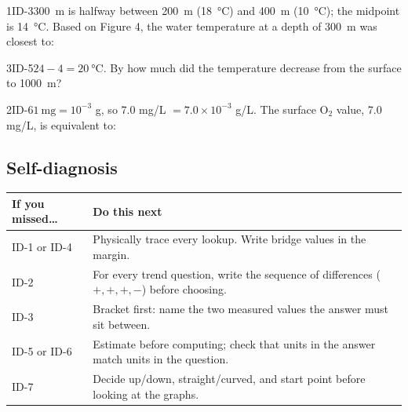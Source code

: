 \documentclass[11pt]{article}
\begin{document}
\begin{q}{1}{ID-3}{\SI{300}{\metre} is halfway between \SI{200}{\metre} (\SI{18}{\celsius}) and \SI{400}{\metre} (\SI{10}{\celsius}); the midpoint is \SI{14}{\celsius}.}
Based on Figure 4, the water temperature at a depth of \SI{300}{\metre} was closest to:
\end{q}

\begin{q}{3}{ID-5}{$24-4=\SI{20}{\celsius}$.}
By how much did the temperature decrease from the surface to \SI{1000}{\metre}?
\end{q}

\begin{q}{2}{ID-6}{$\SI{1}{\milli\gram}=10^{-3}$ g, so 7.0 mg/L $= 7.0\times10^{-3}$ g/L.}
The surface O$_2$ value, 7.0 mg/L, is equivalent to:
\end{q}

\vspace{2ex}
\subsection*{Self-diagnosis}
\small
\begin{tabularx}{\linewidth}{@{}l X@{}}
\toprule
If you missed\ldots & Do this next\\\midrule
ID-1 or ID-4 & Physically trace every lookup. Write bridge values in the margin.\\
ID-2 & For every trend question, write the sequence of differences ($+,+,+,-$) before choosing.\\
ID-3 & Bracket first: name the two measured values the answer must sit between.\\
ID-5 or ID-6 & Estimate before computing; check that units in the answer match units in the question.\\
ID-7 & Decide up/down, straight/curved, and start point before looking at the graphs.\\
\bottomrule
\end{tabularx}

\makekey
\end{document}
